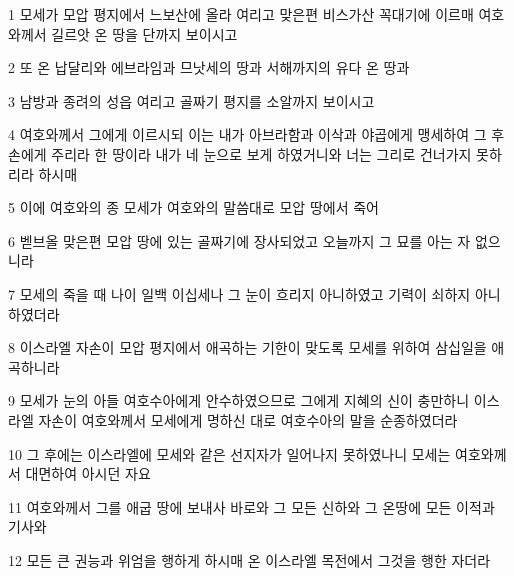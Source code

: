\par 1 모세가 모압 평지에서 느보산에 올라 여리고 맞은편 비스가산 꼭대기에 이르매 여호와께서 길르앗 온 땅을 단까지 보이시고
\par 2 또 온 납달리와 에브라임과 므낫세의 땅과 서해까지의 유다 온 땅과
\par 3 남방과 종려의 성읍 여리고 골짜기 평지를 소알까지 보이시고
\par 4 여호와께서 그에게 이르시되 이는 내가 아브라함과 이삭과 야곱에게 맹세하여 그 후손에게 주리라 한 땅이라 내가 네 눈으로 보게 하였거니와 너는 그리로 건너가지 못하리라 하시매
\par 5 이에 여호와의 종 모세가 여호와의 말씀대로 모압 땅에서 죽어
\par 6 벧브올 맞은편 모압 땅에 있는 골짜기에 장사되었고 오늘까지 그 묘를 아는 자 없으니라
\par 7 모세의 죽을 때 나이 일백 이십세나 그 눈이 흐리지 아니하였고 기력이 쇠하지 아니하였더라
\par 8 이스라엘 자손이 모압 평지에서 애곡하는 기한이 맞도록 모세를 위하여 삼십일을 애곡하니라
\par 9 모세가 눈의 아들 여호수아에게 안수하였으므로 그에게 지혜의 신이 충만하니 이스라엘 자손이 여호와께서 모세에게 명하신 대로 여호수아의 말을 순종하였더라
\par 10 그 후에는 이스라엘에 모세와 같은 선지자가 일어나지 못하였나니 모세는 여호와께서 대면하여 아시던 자요
\par 11 여호와께서 그를 애굽 땅에 보내사 바로와 그 모든 신하와 그 온땅에 모든 이적과 기사와
\par 12 모든 큰 권능과 위엄을 행하게 하시매 온 이스라엘 목전에서 그것을 행한 자더라


